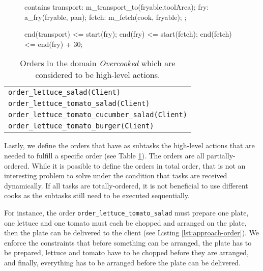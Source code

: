 \begin{figure}
  \begin{anmlcode}
  [all] contains {
    transport: m_transport_to(fryable,toolArea);
    fry: a_fry(fryable, pan);
    fetch: m_fetch(cook, fryable);
  };
  
  end(transport) <= start(fry);
  end(fry) <= start(fetch);
  end(fetch) <= end(fry) + 30; 
  \end{anmlcode}
  \label{lst:approach-fry}
\end{figure}

\begin{table}
  \centering
  \begin{tabular}{l}
    \verb|order_lettuce_salad(Client)|\\
    \verb|order_lettuce_tomato_salad(Client)| \\
    \verb|order_lettuce_tomato_cucumber_salad(Client)|  \\
    \verb|order_lettuce_tomato_burger(Client)|
  \end{tabular}
  \caption{Orders in the domain \textit{Overcooked} which are considered to be high-level actions.}
  \label{tab:approach-domain-orders}
\end{table}


Lastly, we define the orders that have as subtasks the high-level actions that are needed to fulfill a specific order (see Table \ref{tab:approach-domain-orders}).
The orders are all partially-ordered.
While it is possible to define the orders in total order, that is not an interesting problem to solve under the condition that tasks are received dynamically.
If all tasks are totally-ordered, it is not beneficial to use different cooks as the subtasks still need to be executed sequentially.

For instance, the order \verb|order_lettuce_tomato_salad| must prepare one plate, one lettuce and one tomato must each be chopped and arranged on the plate, then the plate can be delivered to the client (see Listing \ref{lst:approach-order}).
We enforce the constraints that before something can be arranged, the plate has to be prepared, lettuce and tomato have to be chopped before they are arranged, and finally, everything has to be arranged before the plate can be delivered.

